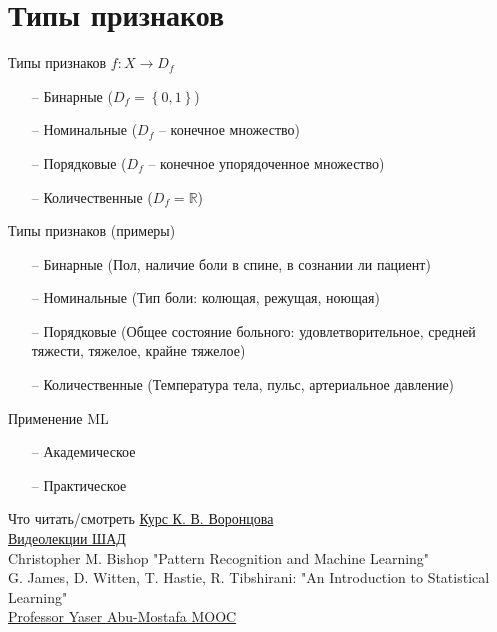 \documentclass[10pt]{beamer}
\begin{document}
\section{Типы признаков}

\begin{frame}{Типы признаков}
	${f: X \rightarrow D_f}$
	\begin{itemize} [<+->]
	  \item[--] Бинарные (${D_f = \left\{ 0, 1 \right\} }$)
	  \item[--] Номинальные (${D_f}$ -- конечное множество)
	  \item[--] Порядковые (${D_f}$ -- конечное упорядоченное множество)
	  \item[--] Количественные (${D_f = \mathbb{R} }$)
	\end{itemize}
\end{frame}

\begin{frame}{Типы признаков (примеры)}
	\begin{itemize} [<+->]
	  \item[--] Бинарные (Пол, наличие боли в спине, в сознании ли пациент)
	  \item[--] Номинальные (Тип боли: колющая, режущая, ноющая)
	  \item[--] Порядковые (Общее состояние больного: удовлетворительное, средней тяжести, тяжелое, крайне тяжелое)
	  \item[--] Количественные (Температура тела, пульс, артериальное давление)
	\end{itemize}
\end{frame}

\begin{frame}{Применение ML}
	\begin{itemize} [<+->]
	  \item[--] Академическое
	  \item[--] Практическое
	\end{itemize}
\end{frame}

\begin{frame}{Что читать/смотреть}
  \href{http://www.machinelearning.ru/wiki/images/6/6d/Voron-ML-1.pdf}{Курс К. В. Воронцова}\\
	\href{https://yandexdataschool.ru/edu-process/courses/machine-learning}{Видеолекции ШАД}\\
	Christopher M. Bishop "Pattern Recognition and Machine Learning"\\
	G. James, D. Witten, T. Hastie, R. Tibshirani: "An Introduction to Statistical Learning" 	\\
	\href{http://work.caltech.edu/telecourse.html}{Professor Yaser Abu-Mostafa MOOC}
\end{frame}
\end{document}
